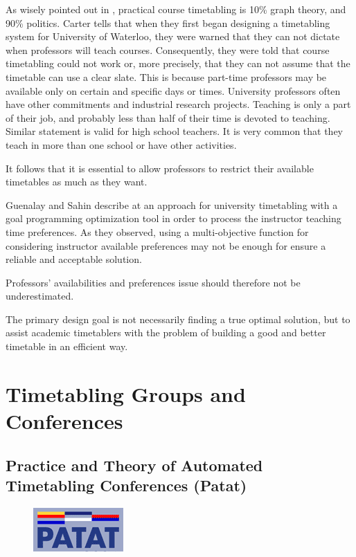 As wisely pointed out in \cite{Carter2001}, practical course timetabling is 10\% graph theory, and 90\% politics. Carter tells that when they first began designing a timetabling system for University of Waterloo, they were warned that they can not dictate when professors will teach courses. Consequently, they were told that course timetabling could not work or, more precisely, that they can not assume that the timetable can use a clear slate. This is because part-time professors may be available only on certain and specific days or times. University professors often have other commitments and industrial research projects. Teaching is only a part of their job, and probably less than half of their time is devoted to teaching. Similar statement is valid for high school teachers. It is very common that they teach in more than one school or have other activities.

It follows that it is essential to allow professors to restrict their available timetables as much as they want.

Guenalay and Sahin describe at \cite{Guenalay2006} an approach for university timetabling with a goal programming optimization tool in order to process the instructor teaching time preferences. As they observed, using a multi-objective function for considering instructor available preferences may not be enough for ensure a reliable and acceptable solution.

Professors' availabilities and preferences issue should therefore not be underestimated.

The primary design goal is not necessarily finding a true optimal solution, but to assist academic timetablers with the problem of building a good and better timetable in an efficient way.


\section{Timetabling Groups and Conferences}

\subsection{Practice and Theory of Automated Timetabling Conferences (Patat)}
\label{patat}

\begin{figure}[h]
\hfill\includegraphics[scale=0.8]{figures/patat.png}
\end{figure}

